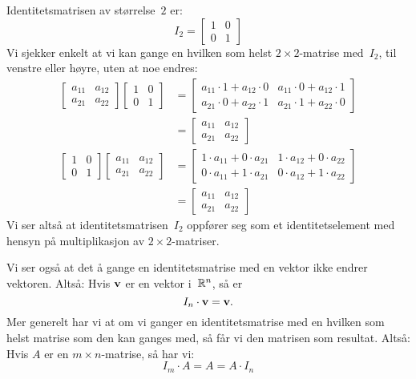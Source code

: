 \begin{ex}
Identitetsmatrisen av størrelse~$2$ er:
\[
I_2 =
\begin{bmatrix}
1 & 0 \\
0 & 1
\end{bmatrix}
\]
Vi sjekker enkelt at vi kan gange en hvilken som helst
$2 \times 2$-matrise med~$I_2$, til venstre eller høyre, uten at noe
endres:
\begin{align*}
\begin{bmatrix}
a_{11} & a_{12} \\
a_{21} & a_{22}
\end{bmatrix}
\begin{bmatrix}
1 & 0 \\
0 & 1
\end{bmatrix}
&=
\begin{bmatrix}
a_{11} \cdot 1 + a_{12} \cdot 0 &
a_{11} \cdot 0 + a_{12} \cdot 1 \\
a_{21} \cdot 0 + a_{22} \cdot 1 &
a_{21} \cdot 1 + a_{22} \cdot 0
\end{bmatrix}
\\
&=
\begin{bmatrix}
a_{11} & a_{12} \\
a_{21} & a_{22}
\end{bmatrix}
\\[4pt]
\begin{bmatrix}
1 & 0 \\
0 & 1
\end{bmatrix}
\begin{bmatrix}
a_{11} & a_{12} \\
a_{21} & a_{22}
\end{bmatrix}
&=
\begin{bmatrix}
1 \cdot a_{11} + 0 \cdot a_{21} &
1 \cdot a_{12} + 0 \cdot a_{22} \\
0 \cdot a_{11} + 1 \cdot a_{21} &
0 \cdot a_{12} + 1 \cdot a_{22}
\end{bmatrix}
\\
&=
\begin{bmatrix}
a_{11} & a_{12} \\
a_{21} & a_{22}
\end{bmatrix}
\end{align*}
Vi ser altså at identitetsmatrisen~$I_2$ oppfører seg som et
identitetselement med hensyn på multiplikasjon av
$2 \times 2$-matriser.
\end{ex}

Vi ser også at det å gange en identitetsmatrise med en vektor ikke
endrer vektoren.  Altså: Hvis $\mathbf{v}$ er en vektor i~$\mathbb{R}^n$, så er
\[
I_n \cdot \mathbf{v} = \mathbf{v}.
\]
Mer generelt har vi at om vi ganger en identitetsmatrise med en
hvilken som helst matrise som den kan ganges med, så får vi den
matrisen som resultat.  Altså: Hvis $A$ er en $m \times n$-matrise, så
har vi:
\[
I_m \cdot A = A = A \cdot I_n
\]


